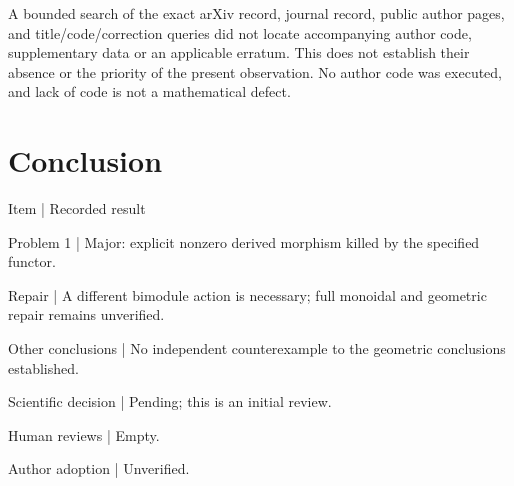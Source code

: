 \documentclass[10pt]{article}
\begin{document}
A bounded search of the exact arXiv record, journal record, public author pages, and title/code/correction queries did not locate accompanying author code, supplementary data or an applicable erratum. This does not establish their absence or the priority of the present observation. No author code was executed, and lack of code is not a mathematical defect.\par
\section*{Conclusion}
Item | Recorded result\par
Problem 1 | Major: explicit nonzero derived morphism killed by the specified functor.\par
Repair | A different bimodule action is necessary; full monoidal and geometric repair remains unverified.\par
Other conclusions | No independent counterexample to the geometric conclusions established.\par
Scientific decision | Pending; this is an initial review.\par
Human reviews | Empty.\par
Author adoption | Unverified.\par
\end{document}
